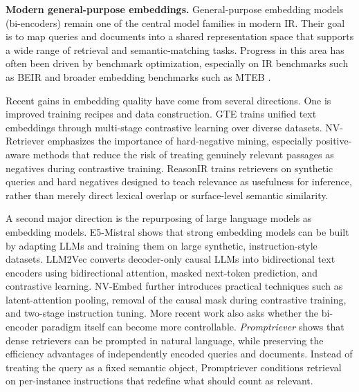\noindent\textbf{Modern general-purpose embeddings.}
General-purpose embedding models (bi-encoders) remain one of the central model families in modern IR. Their goal is to map queries and documents into a shared representation space that supports a wide range of retrieval and semantic-matching tasks. Progress in this area has often been driven by benchmark optimization, especially on IR benchmarks such as BEIR  and broader embedding benchmarks such as MTEB .

Recent gains in embedding quality have come from several directions. One is improved training recipes and data construction. GTE  trains unified text embeddings through multi-stage contrastive learning over diverse datasets. NV-Retriever  emphasizes the importance of hard-negative mining, especially positive-aware methods that reduce the risk of treating genuinely relevant passages as negatives during contrastive training.
ReasonIR  trains retrievers on synthetic queries and hard negatives designed to teach relevance as usefulness for inference, rather than merely direct lexical overlap or surface-level semantic similarity.

A second major direction is the repurposing of large language models as embedding models. E5-Mistral  shows that strong embedding models can be built by adapting LLMs and training them on large synthetic, instruction-style datasets. LLM2Vec  converts decoder-only causal LLMs into bidirectional text encoders using bidirectional attention, masked next-token prediction, and contrastive learning. NV-Embed  further introduces practical techniques such as latent-attention pooling, removal of the causal mask during contrastive training, and two-stage instruction tuning.
More recent work also asks whether the bi-encoder paradigm itself can become more controllable. \emph{Promptriever}  shows that dense retrievers can be prompted in natural language, while preserving the efficiency advantages of independently encoded queries and documents. Instead of treating the query as a fixed semantic object, Promptriever conditions retrieval on per-instance instructions that redefine what should count as relevant.

